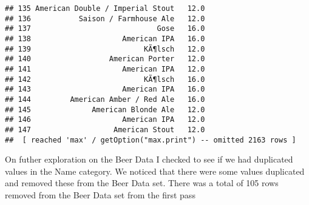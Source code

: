 \documentclass[
]{article}
\newenvironment{Shaded}{\begin{snugshade}}{\end{snugshade}}
\newcommand{\CommentTok}[1]{\textcolor[rgb]{0.56,0.35,0.01}{\textit{#1}}}
\newcommand{\DataTypeTok}[1]{\textcolor[rgb]{0.13,0.29,0.53}{#1}}
\newcommand{\KeywordTok}[1]{\textcolor[rgb]{0.13,0.29,0.53}{\textbf{#1}}}
\newcommand{\NormalTok}[1]{#1}
\newcommand{\OperatorTok}[1]{\textcolor[rgb]{0.81,0.36,0.00}{\textbf{#1}}}
\newcommand{\OtherTok}[1]{\textcolor[rgb]{0.56,0.35,0.01}{#1}}
\newcommand{\StringTok}[1]{\textcolor[rgb]{0.31,0.60,0.02}{#1}}
\begin{document}
\begin{verbatim}
## 135 American Double / Imperial Stout   12.0
## 136           Saison / Farmhouse Ale   12.0
## 137                             Gose   16.0
## 138                     American IPA   16.0
## 139                          KÃ¶lsch   12.0
## 140                  American Porter   12.0
## 141                     American IPA   12.0
## 142                          KÃ¶lsch   16.0
## 143                     American IPA   16.0
## 144         American Amber / Red Ale   16.0
## 145              American Blonde Ale   12.0
## 146                     American IPA   12.0
## 147                   American Stout   12.0
##  [ reached 'max' / getOption("max.print") -- omitted 2163 rows ]
\end{verbatim}

On futher exploration on the Beer Data I checked to see if we had
duplicated values in the Name category. We noticed that there were some
values duplicated and removed these from the Beer Data set. There was a
total of 105 rows removed from the Beer Data set from the first pass

\begin{Shaded}
\end{Shaded}
\end{document}
